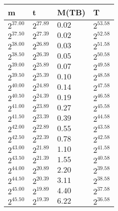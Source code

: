 \begin{tabular}{llll}
m & t & M(TB) & T \\ \hline
$2^{37.00}$ & $2^{27.89}$ & $0.02$ & $2^{53.58}$ \\
$2^{37.50}$ & $2^{27.39}$ & $0.02$ & $2^{52.58}$ \\
$2^{38.00}$ & $2^{26.89}$ & $0.03$ & $2^{51.58}$ \\
$2^{38.50}$ & $2^{26.39}$ & $0.05$ & $2^{50.58}$ \\
$2^{39.00}$ & $2^{25.89}$ & $0.07$ & $2^{49.58}$ \\
$2^{39.50}$ & $2^{25.39}$ & $0.10$ & $2^{48.58}$ \\
$2^{40.00}$ & $2^{24.89}$ & $0.14$ & $2^{47.58}$ \\
$2^{40.50}$ & $2^{24.39}$ & $0.19$ & $2^{46.58}$ \\
$2^{41.00}$ & $2^{23.89}$ & $0.27$ & $2^{45.58}$ \\
$2^{41.50}$ & $2^{23.39}$ & $0.39$ & $2^{44.58}$ \\
$2^{42.00}$ & $2^{22.89}$ & $0.55$ & $2^{43.58}$ \\
$2^{42.50}$ & $2^{22.39}$ & $0.78$ & $2^{42.58}$ \\
$2^{43.00}$ & $2^{21.89}$ & $1.10$ & $2^{41.58}$ \\
$2^{43.50}$ & $2^{21.39}$ & $1.55$ & $2^{40.58}$ \\
$2^{44.00}$ & $2^{20.89}$ & $2.20$ & $2^{39.58}$ \\
$2^{44.50}$ & $2^{20.39}$ & $3.11$ & $2^{38.58}$ \\
$2^{45.00}$ & $2^{19.89}$ & $4.40$ & $2^{37.58}$ \\
$2^{45.50}$ & $2^{19.39}$ & $6.22$ & $2^{36.58}$ \\
\end{tabular}
\\\\
\\\\
